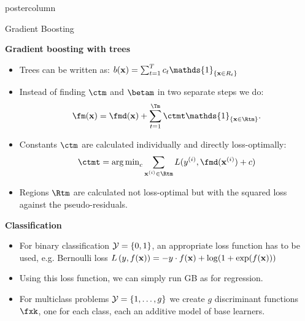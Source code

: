 \documentclass{beamer}
\begin{document}
\begin{frame}[fragile]{}
\begin{columns}
\begin{column}{.31\textwidth}
\begin{beamercolorbox}[center]{postercolumn}
\begin{minipage}{.98\textwidth}
{\begin{myblock}{Gradient Boosting}
          \begin{codebox}
            \textbf{Gradient boosting with trees}
          \end{codebox}
          \begin{itemize}[$\bullet$]
            \setlength{\itemindent}{+.3in}
            \item
              Trees can be written as: $ b(\xv) = \sum_{t=1}^{T} c_t \mathds{1}_{\{\xv \in R_t\}} $
            \item
              Instead of finding $\ctm$ and $\betam$ in two separate steps we do:
              $$
              \fm(\xv) = \fmd(\xv) +  \sum_{t=1}^{\Tm} \ctmt \mathds{1}_{\{\xv \in \Rtm\}}.
              $$
            \item
              Constants $\ctm$ are calculated individually and directly loss-optimally:
              $$
              \ctmt = \argmin_{c} \sum_{\xi \in \Rtm} L(\yi, \fmd(\xi) + c)
              $$
             \item
               Regions $\Rtm$ are calculated not loss-optimal but with the squared loss
               against the pseudo-residuals.
          \end{itemize}
          \begin{codebox}
            \textbf{Classification}
          \end{codebox}
          \begin{itemize}[$\bullet$]
            \setlength{\itemindent}{+.3in}
            \item
              For binary classification $\mathcal{Y} = \{0, 1\}$, an appropriate loss
              function has to be used, e.g. Bernoulli loss $L\left(y, f(\mathbf{x})\right) = - y \cdot f(\mathbf{x}) + \log(1 + \exp(f(\mathbf{x})))$
            \item
              Using this loss function, we can simply run GB as for regression.
             \item
               For multiclass problems $\mathcal{Y} = \{1, \ldots, g\}$ we create $g$
               discriminant functions $\fxk$, one for each class, each an additive
               model of base learners.
          \end{itemize}
        \end{myblock}
      } %
    \end{minipage}
  \end{beamercolorbox}
\end{column}



\end{columns}
\end{frame}
\end{document}
